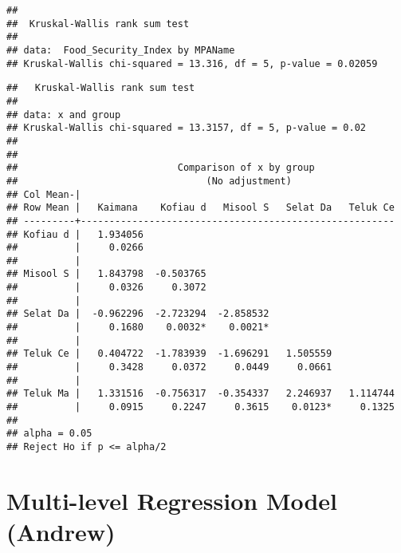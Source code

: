 \documentclass[
]{article}
\newenvironment{Shaded}{\begin{snugshade}}{\end{snugshade}}
\newcommand{\CommentTok}[1]{\textcolor[rgb]{0.56,0.35,0.01}{\textit{#1}}}
\newcommand{\FunctionTok}[1]{\textcolor[rgb]{0.13,0.29,0.53}{\textbf{#1}}}
\newcommand{\NormalTok}[1]{#1}
\newcommand{\OtherTok}[1]{\textcolor[rgb]{0.56,0.35,0.01}{#1}}
\newcommand{\SpecialCharTok}[1]{\textcolor[rgb]{0.81,0.36,0.00}{\textbf{#1}}}
\begin{document}
\begin{verbatim}
## 
##  Kruskal-Wallis rank sum test
## 
## data:  Food_Security_Index by MPAName
## Kruskal-Wallis chi-squared = 13.316, df = 5, p-value = 0.02059
\end{verbatim}

\begin{Shaded}
\end{Shaded}

\begin{verbatim}
##   Kruskal-Wallis rank sum test
## 
## data: x and group
## Kruskal-Wallis chi-squared = 13.3157, df = 5, p-value = 0.02
## 
## 
##                            Comparison of x by group                            
##                                 (No adjustment)                                
## Col Mean-|
## Row Mean |   Kaimana    Kofiau d   Misool S   Selat Da   Teluk Ce
## ---------+-------------------------------------------------------
## Kofiau d |   1.934056
##          |     0.0266
##          |
## Misool S |   1.843798  -0.503765
##          |     0.0326     0.3072
##          |
## Selat Da |  -0.962296  -2.723294  -2.858532
##          |     0.1680    0.0032*    0.0021*
##          |
## Teluk Ce |   0.404722  -1.783939  -1.696291   1.505559
##          |     0.3428     0.0372     0.0449     0.0661
##          |
## Teluk Ma |   1.331516  -0.756317  -0.354337   2.246937   1.114744
##          |     0.0915     0.2247     0.3615    0.0123*     0.1325
## 
## alpha = 0.05
## Reject Ho if p <= alpha/2
\end{verbatim}

\section{Multi-level Regression Model
(Andrew)}\label{multi-level-regression-model-andrew}
\end{document}
